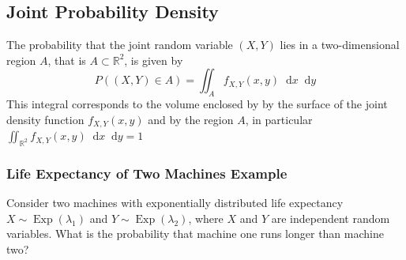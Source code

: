 \documentclass[11pt]{article}
\newcommand*\R{\mathbb{R}}
\newcommand*\diff{\mathop{}\!\mathrm{d}}
\newcommand*\Exp[1]{\mathop{\text{Exp}}\left(#1\right)}
\begin{document}
\subsection{Joint Probability Density}
The probability that the joint random variable $(X,Y)$ lies in a two-dimensional region $A$, that is $A\subset \R^2$, is given by
\begin{equation*}
	P\left( (X,Y) \in A \right) = \iint_{A} f_{X,Y}(x,y) \diff x \diff y
\end{equation*}
This integral corresponds to the volume enclosed by by the surface of the joint density function $f_{X,Y}(x,y)$ and by the region $A$, in particular $\iint_{\R^2} f_{X,Y}(x,y) \diff x\diff y = 1$

\subsubsection{Life Expectancy of Two Machines Example}
Consider two machines with exponentially distributed life expectancy $X\sim \Exp{\lambda_1}$ and $Y\sim\Exp{\lambda_2}$, where $X$ and $Y$ are independent random variables. What is the probability that machine one runs longer than machine two?
\end{document}
